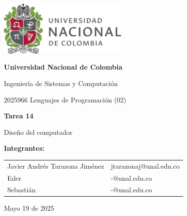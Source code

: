 \documentclass{article}
\begin{document}
\begin{titlepage}
    \centering
    \includegraphics[width=0.48\textwidth]{logo_universidad.png}
    \par\vspace{2cm}

    {\Large \textbf{Universidad Nacional de Colombia} \par}
    \vspace{0.5cm}
    {\large Ingeniería de Sistemas y Computación \par}
    {\large 2025966 Lenguajes de Programación (02)\par}
    \vspace{3cm}

    {\large \textbf{Tarea 14} \par}
    {\large Diseño del computador\par}
    \vspace{3cm}

    {\large \textbf{Integrantes:} \par}
    \vspace{0.5cm}
    \begin{tabular}{ll}
    Javier Andrés Tarazona Jiménez & jtarazonaj@unal.edu.co \\
    Eder & -@unal.edu.co \\
    Sebastián & -@unal.edu.co \\
    \end{tabular}
    \par\vspace{3cm}

    {\large Mayo 19 de 2025 \par}
\end{titlepage}

\tableofcontents %

\newpage %

\end{document}
